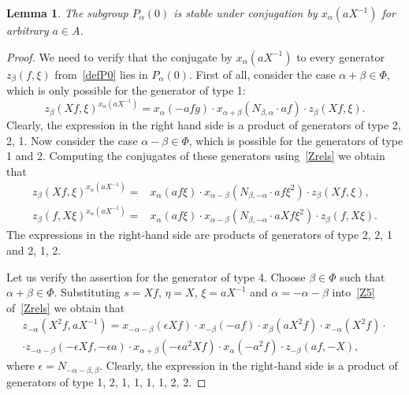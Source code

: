 \documentclass[oneside, 8pt]{amsart}
\newtheorem{lemma}{Lemma}
\theoremstyle{remark}
\theoremstyle{definition}
\numberwithin{equation}{section}
\begin{document}
\begin{lemma}\label{P0_conj} The subgroup $P_\alpha(0)$ is stable under conjugation by $x_\alpha(aX^{-1})$ for arbitrary $a\in A$. \end{lemma}
\begin{proof} We need to verify that the conjugate by $x_\alpha(aX^{-1})$ to every generator $z_\beta(f, \xi)$ from~\cref{defP0} lies in $P_\alpha(0)$. 
First of all, consider the case $\alpha + \beta \in \Phi$, which is only possible for the generator of type 1:
\begin{equation}\label{eq:Zconj1} z_{\beta}(Xf, \xi) ^ {x_{\alpha}(aX^{-1})} = x_{\alpha} (- afg) \cdot x_{\alpha+\beta} (N_{\beta, \alpha}\cdot af) \cdot z_{\beta}(Xf, \xi). \end{equation}
Clearly, the expression in the right hand side is a product of generators of type 2, 2, 1. 
Now consider the case $\alpha - \beta \in \Phi$, which is possible for the generators of type 1 and 2.
Computing the conjugates of these generators using~\cref{Zrels} we obtain that
\begin{align} z_{\beta}(Xf, \xi) ^ {x_{\alpha}(aX^{-1})} = &  x_{\alpha} (af\xi) \cdot x_{\alpha-\beta} (N_{\beta,-\alpha}\cdot af\xi^2) \cdot z_{\beta}(Xf, \xi), \label{eq:Zconj2} \\
z_{\beta}(f, X\xi) ^ {x_{\alpha}(aX^{-1})} = & x_{\alpha} (af\xi) \cdot x_{\alpha-\beta} (N_{\beta,-\alpha}\cdot aXf\xi^2) \cdot z_{\beta}(f, X\xi). \nonumber \end{align}
The expressions in the right-hand side are products of generators of type 2, 2, 1 and 2, 1, 2.

Let us verify the assertion for the generator of type 4.
Choose $\beta\in \Phi$ such that $\alpha+\beta \in \Phi$. 
Substituting $s = Xf$, $\eta = X$, $\xi = aX^{-1}$ and $\alpha = -\alpha - \beta$ into~\eqref{Z5} of~\cref{Zrels} we obtain that
\begin{multline} \label{eq:Zconj3} z_{-\alpha}(X^2f, aX^{-1}) = x_{-\alpha-\beta}(\epsilon Xf) \cdot x_{-\beta}(-af) \cdot x_{\beta}(aX^2 f) \cdot x_{-\alpha}(X^2f) \cdot \\
 \cdot z_{-\alpha-\beta}(-\epsilon Xf, -\epsilon a) \cdot x_{\alpha+\beta}(-\epsilon a^2 Xf) \cdot x_{\alpha}(- a^2 f) \cdot z_{-\beta}(a f, -X), \end{multline}
where $\epsilon = N_{-\alpha-\beta,\beta}$. 
Clearly, the expression in the right-hand side is a product of generators of type 1, 2, 1, 1, 1, 1, 2, 2.


\end{proof}
\end{document}
